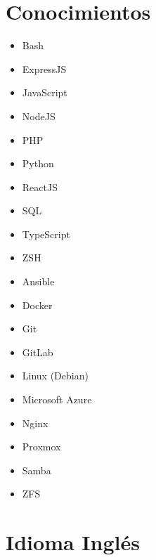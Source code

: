 \documentclass[12pt,letterpaper,sans]{moderncv}
\begin{document}
\section{Conocimientos}
\begin{cvcolumns}
  {
    \begin{itemize}
      \item Bash
      \item ExpressJS
      \item JavaScript
      \item NodeJS
      \item PHP
      \item Python
      \item ReactJS
      \item SQL
      \item TypeScript
      \item ZSH
    \end{itemize}
  }
  {
    \begin{itemize}
      \item Ansible
      \item Docker
      \item Git
      \item GitLab
      \item Linux (Debian)
      \item Microsoft Azure
      \item Nginx
      \item Proxmox
      \item Samba
      \item ZFS
    \end{itemize}
  }
\end{cvcolumns}

\section{Idioma Inglés}
\end{document}
